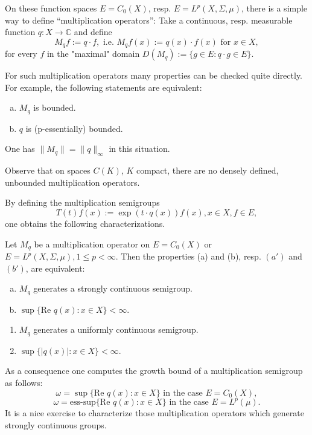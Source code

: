 On these function spaces $E=C_0(X)$, resp. $E=L^p(X,\Sigma,\mu)$, there is a simple way to define \enquote{multiplication operators}: Take a continuous, resp. measurable function $q \colon X \rightarrow \mathbb{C}$ and define
\[
M_{q}f := q \cdot f, \text{ i.e. } M_{q}f(x) := q(x) \cdot f(x) \text{ for } x \in X,
\]
for every $f$ in the "maximal" domain $D(M_{q}) := \{g \in E \colon q \cdot g \in E\}$.

For such multiplication operators many properties can be checked quite directly.
For example, the following statements are equivalent:

\begin{enumerate}[(a)]
\item
$M_{q}$ is bounded.

\item
$q$ is (p-essentially) bounded.

\end{enumerate}
One has $\|M_{q}\| = \|q\|_\infty$ in this situation.

Observe that on spaces $C(K)$, $K$ compact, there are no densely defined, unbounded multiplication operators.

By defining the multiplication semigroups
\[
T(t)f(x) := \exp(t \cdot q(x))f(x), x \in X, f \in E,
\]
one obtains the following characterizations.

\begin{proposition} 
Let $M_{q}$ be a multiplication operator on $E=C_0(X)$ or $E=L^p(X,\Sigma,\mu), 1 \leq p < \infty$.
Then the properties (a) and (b), resp. $(a')$ and $(b')$, are equivalent:
\begin{enumerate}[(a)]
\item
$M_{q}$ generates a strongly continuous semigroup.
\item
$\sup\{\text{Re }q(x) \colon x \in X\} < \infty$.
\end{enumerate}

\begin{enumerate}[($a'$)]
\item
$M_{q}$ generates a uniformly continuous semigroup.
\item
$\sup\{|q(x)| \colon x \in X\} < \infty$.
\end{enumerate}
\end{proposition} 
As a consequence one computes the growth bound of a multiplication semigroup as follows:
\[
\omega = \sup\{\text{Re }q(x) \colon x \in X\} \text{ in the case } E = C_0(X),
\]
\[
\omega = \text{ess-sup}\{\text{Re }q(x) \colon x \in X\} \text{ in the case } E = L^p(\mu).
\]
It is a nice exercise to characterize those multiplication operators which generate strongly continuous groups.


